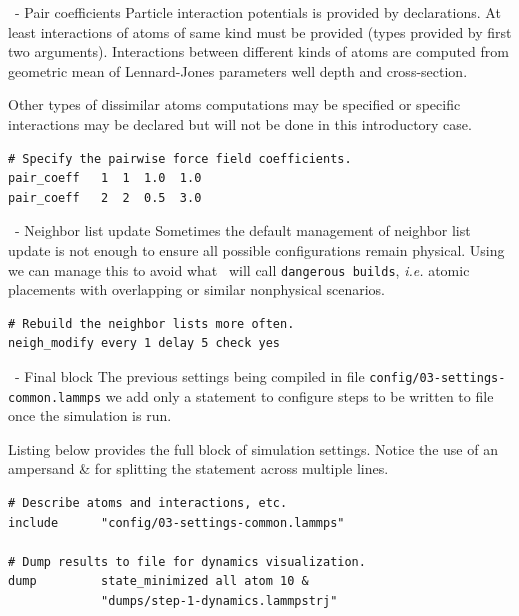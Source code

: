 \begin{frame}[fragile]{\secname}{\subsecname\ - Pair coefficients}
Particle interaction potentials is provided by  declarations. At least interactions of atoms of same kind must be provided (types provided by first two arguments). Interactions between different kinds of atoms are computed from geometric mean of Lennard-Jones parameters well depth and cross-section.

\vspace{0.5cm}

Other types of dissimilar atoms computations may be specified or specific interactions may be declared but will not be done in this introductory case.

\vspace{0.5cm}

\begin{lstlisting}[language=LAMMPS,basicstyle=\small]
# Specify the pairwise force field coefficients.
pair_coeff   1  1  1.0  1.0
pair_coeff   2  2  0.5  3.0
\end{lstlisting}
\end{frame}

\begin{frame}[fragile]{\secname}{\subsecname\ - Neighbor list update}
Sometimes the default management of neighbor list update is not enough to ensure all possible configurations remain physical. Using  we can manage this to avoid what \LAMMPS\ will call \Verb|dangerous builds|, \emph{i.e.} atomic placements with overlapping or similar nonphysical scenarios.

\vspace{0.5cm}

\begin{lstlisting}[language=LAMMPS,basicstyle=\small]
# Rebuild the neighbor lists more often.
neigh_modify every 1 delay 5 check yes
\end{lstlisting}
\end{frame}

\begin{frame}[fragile]{\secname}{\subsecname\ - Final block}
The previous settings being compiled in file \Verb|config/03-settings-common.lammps| we add only a  statement to configure steps to be written to file once the simulation is run.

\vspace{0.5cm}
Listing below provides the full block of simulation settings. Notice the use of an ampersand \& for splitting the  statement across multiple lines.
\vspace{0.5cm}

\begin{lstlisting}[language=LAMMPS,basicstyle=\tiny]
# Describe atoms and interactions, etc.
include      "config/03-settings-common.lammps"

# Dump results to file for dynamics visualization.
dump         state_minimized all atom 10 &
             "dumps/step-1-dynamics.lammpstrj"
\end{lstlisting}
\end{frame}

